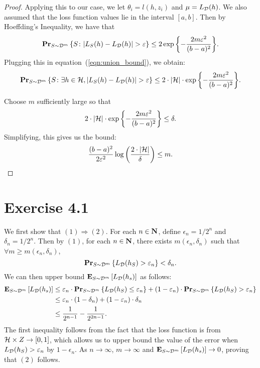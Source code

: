 \begin{proof}
Applying this to our case, we let $\theta_i = l(h, z_i)$ and $\mu = L_{\mathcal{D}}(h)$.
We also assumed that the loss function values lie in the interval $[a, b]$. Then
by Hoeffding's Inequality, we have that
\begin{equation}
    \mathbf{Pr}_{S \sim \mathcal{D}^m} \left \{ S \colon |L_S(h) - L_{\mathcal{D}}(h)| > \varepsilon \right \}
        \leq
    2 \exp{\left \{ - \frac{2 m \varepsilon^2}{(b - a)^2} \right \}}.
\end{equation}
Plugging this in equation~(\ref{eqn:union_bound}), we obtain:
\begin{equation}
    \mathbf{Pr}_{S \sim \mathcal{D}^m} \left \{ S \colon \exists h \in \mathcal{H}, |L_S(h) - L_{\mathcal{D}}(h)| > \varepsilon \right \}
        \leq
    2 \cdot |\mathcal{H}| \cdot \exp{\left \{ - \frac{2 m \varepsilon^2}{(b - a)^2} \right \}}.
\end{equation}

Choose $m$ sufficiently large so that
\[
    2 \cdot |\mathcal{H}| \cdot \exp{\left \{ - \frac{2 m \varepsilon^2}{(b - a)^2} \right \}} \leq \delta.
\]
Simplifying, this gives us the bound:
\[
    \frac{(b - a)^2}{2 \varepsilon^2} \log \left ( \frac{2 \cdot |\mathcal{H}|}{\delta}\right ) \leq m.
\]
\end{proof}

\section*{Exercise 4.1}

We first show that $(1) \Rightarrow (2)$. For each $n \in \mathbf{N}$, define
$\epsilon_n = 1 / 2^n$ and $\delta_n = 1 / 2^n$. Then by $(1)$, for each
$n \in \mathbf{N}$, there exists $m(\epsilon_n, \delta_n)$ such that
$\forall m \geq m(\epsilon_n, \delta_n)$,
\[
    \mathbf{Pr}_{S \sim \mathcal{D}^{m}} \left \{ L_{\mathcal{D}} (h_S) > \varepsilon_n \right \} < \delta_n.
\]
We can then upper bound $\mathbf{E}_{S \sim \mathcal{D}^m} \left [ L_{\mathcal{D}}(h_s) \right ]$ as follows:
\begin{align*}
\mathbf{E}_{S \sim \mathcal{D}^m} \left [ L_{\mathcal{D}} (h_s) \right ]
& \leq \varepsilon_n \cdot  \mathbf{Pr}_{S \sim \mathcal{D}^{m}} \left \{ L_{\mathcal{D}} (h_S) \leq \varepsilon_n \right \} +
    (1 - \varepsilon_n) \cdot  \mathbf{Pr}_{S \sim \mathcal{D}^{m}} \left \{ L_{\mathcal{D}} (h_S) > \varepsilon_n \right \} \\
& \leq \varepsilon_n \cdot (1 - \delta_n) + (1 - \varepsilon_n) \cdot \delta_n \\
& \leq \frac{1}{2^{n - 1}} - \frac{1}{2^{2n - 1}}.
\end{align*}
The first inequality follows from the fact that the loss function is from
$\mathcal{H} \times Z \rightarrow [0, 1]$, which allows us to upper bound the value of the error
when $L_{\mathcal{D}} (h_S) > \varepsilon_n$ by $1 - \epsilon_n$. As $n \to \infty$, $m \to \infty$
and $\mathbf{E}_{S \sim \mathcal{D}^m} \left [ L_{\mathcal{D}} (h_s) \right ] \to 0$, proving that $(2)$ follows.

